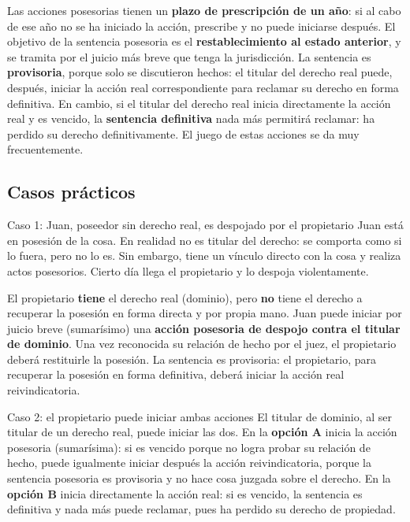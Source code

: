 \documentclass[12pt,oneside]{book}
\begin{document}
Las acciones posesorias tienen un \textbf{plazo de prescripción de un año}: si al cabo de ese año no se ha iniciado la acción, prescribe y no puede iniciarse después. El objetivo de la sentencia posesoria es el \textbf{restablecimiento al estado anterior}, y se tramita por el juicio más breve que tenga la jurisdicción. La sentencia es \textbf{provisoria}, porque solo se discutieron hechos: el titular del derecho real puede, después, iniciar la acción real correspondiente para reclamar su derecho en forma definitiva. En cambio, si el titular del derecho real inicia directamente la acción real y es vencido, la \textbf{sentencia definitiva} nada más permitirá reclamar: ha perdido su derecho definitivamente. El juego de estas acciones se da muy frecuentemente.

\subsection{Casos prácticos}

\begin{example}{Caso 1: Juan, poseedor sin derecho real, es despojado por el propietario}
Juan está en posesión de la cosa. En realidad no es titular del derecho: se comporta como si lo fuera, pero no lo es. Sin embargo, tiene un vínculo directo con la cosa y realiza actos posesorios. Cierto día llega el propietario y lo despoja violentamente.

El propietario \textbf{tiene} el derecho real (dominio), pero \textbf{no} tiene el derecho a recuperar la posesión en forma directa y por propia mano. Juan puede iniciar por juicio breve (sumarísimo) una \textbf{acción posesoria de despojo contra el titular de dominio}. Una vez reconocida su relación de hecho por el juez, el propietario deberá restituirle la posesión. La sentencia es provisoria: el propietario, para recuperar la posesión en forma definitiva, deberá iniciar la acción real reivindicatoria.
\end{example}

\begin{example}{Caso 2: el propietario puede iniciar ambas acciones}
El titular de dominio, al ser titular de un derecho real, puede iniciar las dos. En la \textbf{opción A} inicia la acción posesoria (sumarísima): si es vencido porque no logra probar su relación de hecho, puede igualmente iniciar después la acción reivindicatoria, porque la sentencia posesoria es provisoria y no hace cosa juzgada sobre el derecho. En la \textbf{opción B} inicia directamente la acción real: si es vencido, la sentencia es definitiva y nada más puede reclamar, pues ha perdido su derecho de propiedad.
\end{example}
\end{document}
